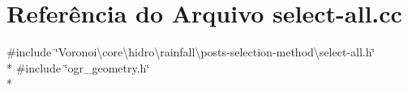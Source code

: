 \section{Referência do Arquivo select-\/all.cc}
\label{select-all_8cc}
{\ttfamily \#include \char`\"{}Voronoi\textbackslash{}core\textbackslash{}hidro\textbackslash{}rainfall\textbackslash{}posts-\/selection-\/method\textbackslash{}select-\/all.\+h\char`\"{}}\\*
{\ttfamily \#include \char`\"{}ogr\+\_\+geometry.\+h\char`\"{}}\\*
